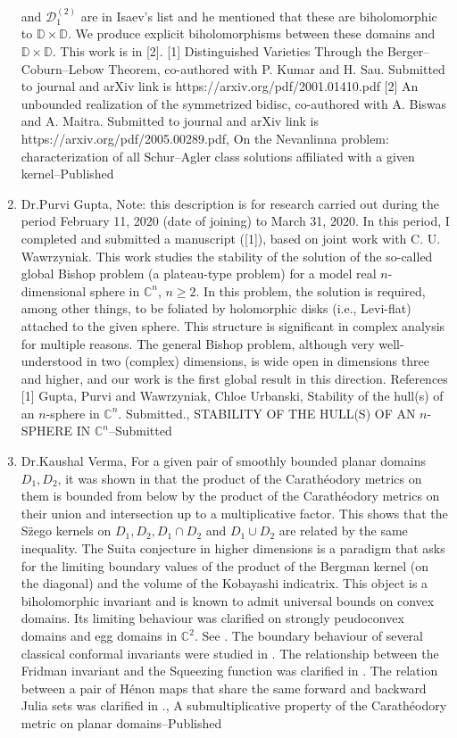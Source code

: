 \begin{enumerate}
and $\mathcal{D}^{(2)} _1$ are in Isaev's list and he mentioned that these are biholomorphic to $\mathbb D \times \mathbb D$. We produce explicit biholomorphisms between these domains and $\mathbb D \times \mathbb D$. This work is in [2].  [1]  Distinguished Varieties Through the Berger--Coburn--Lebow Theorem,  co-authored with P. Kumar and H. Sau. Submitted to journal and arXiv link is https://arxiv.org/pdf/2001.01410.pdf   [2] An unbounded realization of the symmetrized bidisc, co-authored with A. Biswas and A. Maitra. Submitted to journal and arXiv link is  https://arxiv.org/pdf/2005.00289.pdf, On the Nevanlinna problem: characterization of all Schur–Agler class solutions affiliated with a given kernel--Published
\item Dr.Purvi Gupta, Note: this description is for research carried out during the period February 11, 2020 (date of joining) to March 31, 2020.   In this period,  I completed and submitted a manuscript ([1]),  based on joint work with C. U. Wawrzyniak. This work studies the stability of the solution of the so-called global Bishop problem (a plateau-type problem) for a model real $n$-dimensional sphere in $\mathbb{C}^n$, $n\geq 2$. In this problem, the solution is required, among other things, to be foliated by holomorphic disks (i.e., Levi-flat) attached to the given sphere. This structure is significant in complex analysis for multiple reasons. The general Bishop problem, although very well-understood in two (complex) dimensions, is wide open in dimensions three and higher, and our work is the first global result in this direction.    References [1] Gupta, Purvi and Wawrzyniak, Chloe Urbanski, Stability of the hull(s) of an $n$-sphere in $\mathbb{C}^n$. Submitted., STABILITY OF THE HULL(S) OF AN $n$-SPHERE IN $\mathbb{C}^n$--Submitted
\item Dr.Kaushal Verma, For a given pair of smoothly bounded planar domains $D_1, D_2$, it was shown in \cite{1} that the product of the Carath\'{e}odory metrics on them is bounded from below by the product of the Carath\'{e}odory metrics on their union and intersection up to a multiplicative factor. This shows that the S\"{z}ego kernels on $D_1, D_2, D_1 \cap D_2$ and $D_1 \cup D_2$ are related by the same inequality.    The Suita conjecture in higher dimensions is a paradigm that asks for the limiting boundary values of the product of the Bergman kernel (on the diagonal) and the volume of the Kobayashi indicatrix. This object is a biholomorphic invariant and is known to admit universal bounds on convex domains. Its limiting behaviour was clarified on strongly peudoconvex domains and egg domains in $\mathbb C^2$. See \cite{2}.  The boundary behaviour of several classical conformal invariants were studied in \cite{3}.  The relationship between the Fridman invariant and the Squeezing function was clarified in \cite{4}.  The relation between a pair of H\'{e}non maps that share the same forward and backward Julia sets was clarified in \cite{5}., A submultiplicative property of the Carath\'{e}odory metric on planar domains--Published

\end{enumerate}
